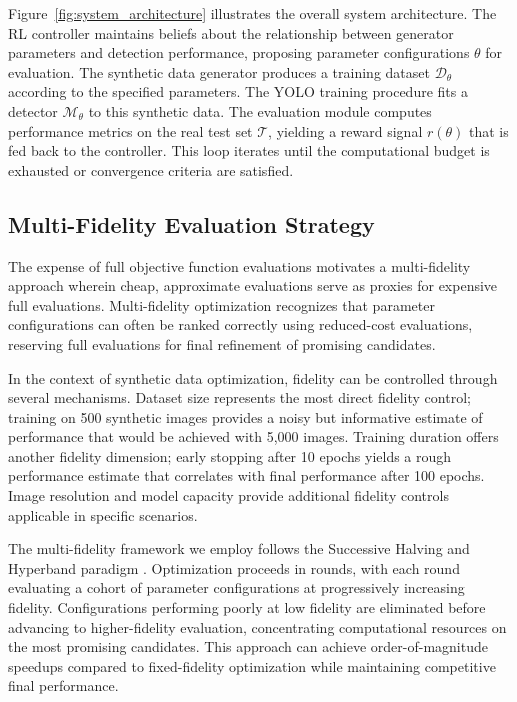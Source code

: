 Figure~\ref{fig:system_architecture} illustrates the overall system architecture. The RL controller maintains beliefs about the relationship between generator parameters and detection performance, proposing parameter configurations $\theta$ for evaluation. The synthetic data generator produces a training dataset $\mathcal{D}_\theta$ according to the specified parameters. The YOLO training procedure fits a detector $\mathcal{M}_\theta$ to this synthetic data. The evaluation module computes performance metrics on the real test set $\mathcal{T}$, yielding a reward signal $r(\theta)$ that is fed back to the controller. This loop iterates until the computational budget is exhausted or convergence criteria are satisfied.

\subsection{Multi-Fidelity Evaluation Strategy}
\label{subsec:multi_fidelity}

The expense of full objective function evaluations motivates a multi-fidelity approach wherein cheap, approximate evaluations serve as proxies for expensive full evaluations. Multi-fidelity optimization recognizes that parameter configurations can often be ranked correctly using reduced-cost evaluations, reserving full evaluations for final refinement of promising candidates.

In the context of synthetic data optimization, fidelity can be controlled through several mechanisms. Dataset size represents the most direct fidelity control; training on 500 synthetic images provides a noisy but informative estimate of performance that would be achieved with 5,000 images. Training duration offers another fidelity dimension; early stopping after 10 epochs yields a rough performance estimate that correlates with final performance after 100 epochs. Image resolution and model capacity provide additional fidelity controls applicable in specific scenarios.

The multi-fidelity framework we employ follows the Successive Halving and Hyperband paradigm \cite{li2017hyperband}. Optimization proceeds in rounds, with each round evaluating a cohort of parameter configurations at progressively increasing fidelity. Configurations performing poorly at low fidelity are eliminated before advancing to higher-fidelity evaluation, concentrating computational resources on the most promising candidates. This approach can achieve order-of-magnitude speedups compared to fixed-fidelity optimization while maintaining competitive final performance.

